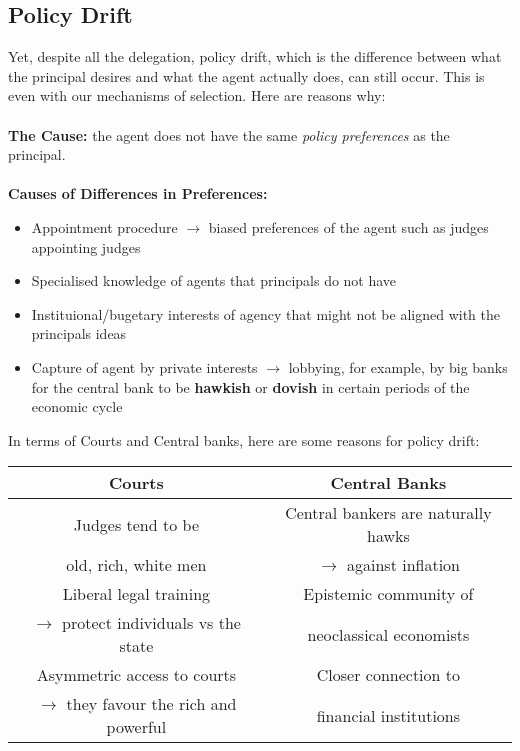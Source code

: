\documentclass[12pt, letterpaper]{article}
\begin{document}
\subsection{Policy Drift}
Yet, despite all the delegation, policy drift, which is the difference between what the principal desires and what the agent actually does, can still occur. This is even with our mechanisms of selection. Here are reasons why:\\\\
\textbf{The Cause:} the agent does not have the same \textit{policy preferences} as the principal.\\\\
\textbf{Causes of Differences in Preferences:}
\begin{itemize}
	\item Appointment procedure $\rightarrow$ biased preferences of the agent such as judges appointing judges
	\item Specialised knowledge of agents that principals do not have
	\item Instituional/bugetary interests of agency that might not be aligned with the principals ideas
	\item Capture of agent by private interests $\rightarrow$ lobbying, for example, by big banks for the central bank to be \textbf{hawkish} or \textbf{dovish} in certain periods of the economic cycle
\end{itemize}
In terms of Courts and Central banks, here are some reasons for policy drift:
\begin{center}
\begin{adjustbox}{width=.85\textwidth}
\begin{tabular}{c|c}
Courts & Central Banks\\
\hline
Judges tend to be & Central bankers are naturally hawks \\ 
old, rich, white men & $\rightarrow$ against inflation \\
Liberal legal training  & Epistemic community of \\ $\rightarrow$ protect individuals vs the state & neoclassical economists\\
Asymmetric access to courts & Closer connection to \\  $\rightarrow$ they favour the rich and powerful & financial institutions\\
\hline
\end{tabular}
\end{adjustbox}
\end{center}
\end{document}
